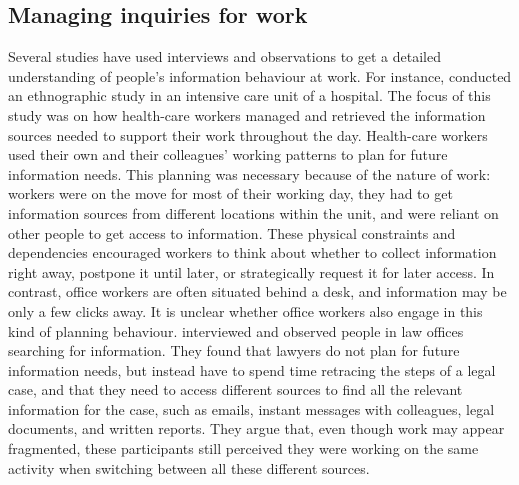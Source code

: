 \subsection{Managing inquiries for work}
Several studies have used interviews and observations to get a detailed understanding of people's information behaviour at work. For instance, \citet{Reddy2002} conducted an ethnographic study in an intensive care unit of a hospital. The focus of this study was on how health-care workers managed and retrieved the information sources needed to support their work throughout the day. Health-care workers used their own and their colleagues' working patterns to plan for future information needs. This planning was necessary because of the nature of work: workers were on the move for most of their working day, they had to get information sources from different locations within the unit, and were reliant on other people to get access to information. These physical constraints and dependencies encouraged workers to think about whether to collect information right away, postpone it until later, or strategically request it for later access. In contrast, office workers are often situated behind a desk, and information may be only a few clicks away. It is unclear whether office workers also engage in this kind of planning behaviour. \citet{Cangiano2009} interviewed and observed people in law offices searching for information. They found that lawyers do not plan for future information needs, but instead have to spend time retracing the steps of a legal case, and that they need to access different sources to find all the relevant information for the case, such as emails, instant messages with colleagues, legal documents, and written reports. They argue that, even though work may appear fragmented, these participants still perceived they were working on the same activity when switching between all these different sources.


